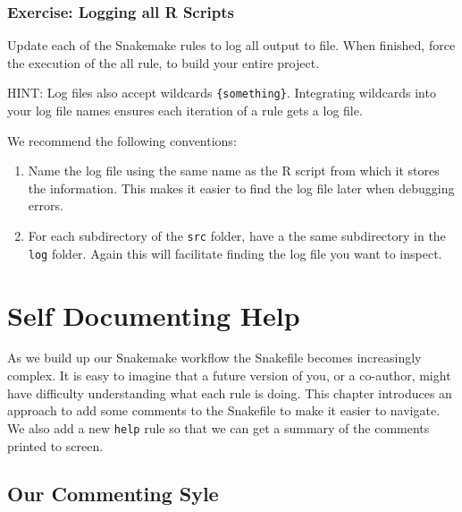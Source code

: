\documentclass[]{book}
\providecommand{\tightlist}{%
  \setlength{\itemsep}{0pt}\setlength{\parskip}{0pt}}
\theoremstyle{definition}
\theoremstyle{definition}
\theoremstyle{definition}
\theoremstyle{remark}
\begin{document}
\subsection*{Exercise: Logging all R
Scripts}\label{exercise-logging-all-r-scripts}

Update each of the Snakemake rules to log all output to file. When
finished, force the execution of the all rule, to build your entire
project.

HINT: Log files also accept wildcards \texttt{\{something\}}.
Integrating wildcards into your log file names ensures each iteration of
a rule gets a log file.

We recommend the following conventions:

\begin{enumerate}
\def\labelenumi{\arabic{enumi}.}
\tightlist
\item
  Name the log file using the same name as the R script from which it
  stores the information. This makes it easier to find the log file
  later when debugging errors.
\item
  For each subdirectory of the \texttt{src} folder, have a the same
  subdirectory in the \texttt{log} folder. Again this will facilitate
  finding the log file you want to inspect.
\end{enumerate}

\chapter{Self Documenting Help}\label{self-documenting-help}

As we build up our Snakemake workflow the Snakefile becomes increasingly
complex. It is easy to imagine that a future version of you, or a
co-author, might have difficulty understanding what each rule is doing.
This chapter introduces an approach to add some comments to the
Snakefile to make it easier to navigate. We also add a new \texttt{help}
rule so that we can get a summary of the comments printed to screen.

\section{Our Commenting Syle}\label{our-commenting-syle}
\end{document}
